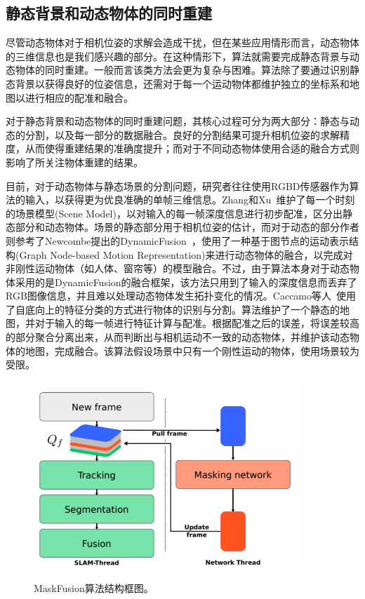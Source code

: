 \subsection{静态背景和动态物体的同时重建}
\label{subsec:static_and_dynamic}

尽管动态物体对于相机位姿的求解会造成干扰，但在某些应用情形而言，动态物体的三维信息也是我们感兴趣的部分。在这种情形下，算法就需要完成静态背景与动态物体的同时重建。一般而言该类方法会更为复杂与困难。算法除了要通过识别静态背景以获得良好的位姿信息，还需对于每一个运动物体都维护独立的坐标系和地图以进行相应的配准和融合。

对于静态背景和动态物体的同时重建问题，其核心过程可分为两大部分：静态与动态的分割，以及每一部分的数据融合。良好的分割结果可提升相机位姿的求解精度，从而使得重建结果的准确度提升；而对于不同动态物体使用合适的融合方式则影响了所关注物体重建的结果。

目前，对于动态物体与静态场景的分割问题，研究者往往使用RGBD传感器作为算法的输入，以获得更为优良准确的单帧三维信息。Zhang和Xu~\cite{2017MixedFusion}维护了每一个时刻的场景模型(Scene Model)，以对输入的每一帧深度信息进行初步配准，区分出静态部分和动态物体。场景的静态部分用于相机位姿的估计，而对于动态的部分作者则参考了Newcombe提出的DynamicFusion~\cite{2015DynamicFusion}，使用了一种基于图节点的运动表示结构(Graph Node-based Motion Representation)来进行动态物体的融合，以完成对非刚性运动物体（如人体、窗帘等）的模型融合。不过，由于算法本身对于动态物体采用的是DynamicFusion的融合框架，该方法只用到了输入的深度信息而丢弃了RGB图像信息，并且难以处理动态物体发生拓扑变化的情况。Caccamo等人~\cite{2017Joint3D}使用了自底向上的特征分类的方式进行物体的识别与分割。算法维护了一个静态的地图，并对于输入的每一帧进行特征计算与配准。根据配准之后的误差，将误差较高的部分聚合分离出来，从而判断出与相机运动不一致的动态物体，并维护该动态物体的地图，完成融合。该算法假设场景中只有一个刚性运动的物体，使用场景较为受限。

\begin{figure}[htbp]
	\centering
	\includegraphics[width=0.9\textwidth]{figs/2-2/maskfusion.png} 
	\label{fig:MaskFusion-framework}
	\caption{MaskFusion算法结构框图。}
\end{figure}


